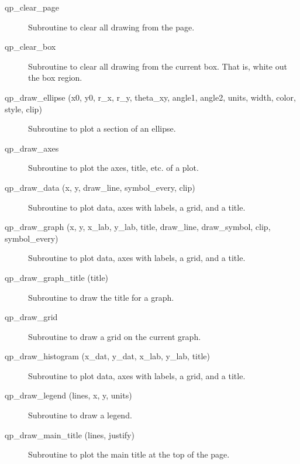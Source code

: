 \begin{description}

\item[qp\_clear\_page] \Newline 
     Subroutine to clear all drawing from the page.

\item[qp\_clear\_box] \Newline 
     Subroutine to clear all drawing from the current box.
     That is, white out the box region.

\item[qp\_draw\_ellipse (x0, y0, r\_x, r\_y, theta\_xy, angle1, angle2, 
                     units, width, color, style, clip) ] \Newline 
     Subroutine to plot a section of an ellipse.

\item[qp\_draw\_axes] \Newline 
     Subroutine to plot the axes, title, etc. of a plot.

\item[qp\_draw\_data (x, y, draw\_line, symbol\_every, clip)] \Newline
     Subroutine to plot data, axes with labels, a grid, and a title.

\item[qp\_draw\_graph (x, y, x\_lab, y\_lab, title, 
                  draw\_line, draw\_symbol, clip, symbol\_every) ] \Newline 
     Subroutine to plot data, axes with labels, a grid, and a title.

\item[qp\_draw\_graph\_title (title)] \Newline 
     Subroutine to draw the title for a graph.

\item[qp\_draw\_grid] \Newline 
     Subroutine to draw a grid on the current graph.

\item[qp\_draw\_histogram (x\_dat, y\_dat, x\_lab, y\_lab, title)] \Newline 
     Subroutine to plot data, axes with labels, a grid, and a title.

\item[qp\_draw\_legend (lines, x, y, units)] \Newline 
     Subroutine to draw a legend.

\item[qp\_draw\_main\_title (lines, justify)] \Newline 
     Subroutine to plot the main title at the top of the page.


\end{description}
